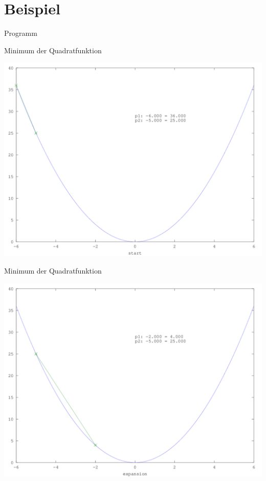 \documentclass[\outputformat]{beamer}
\begin{document}


\section{Beispiel}
\begin{frame}{Programm}\tableofcontents[currentsection]\end{frame}

\begin{frame}{Minimum der Quadratfunktion}
	\begin{center}
		\includegraphics[height=0.75\paperheight]{../bilder/Quadrat/sinx_x001.png}
	\end{center}
\end{frame}
\begin{frame}{Minimum der Quadratfunktion}
	\begin{center}
		\includegraphics[height=0.75\paperheight]{../bilder/Quadrat/sinx_x002.png}
	\end{center}
\end{frame}
\end{document}
